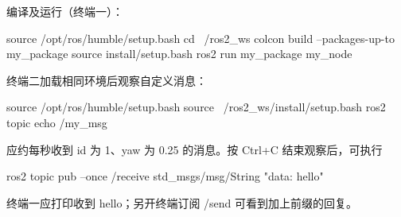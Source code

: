 \begin{example}
编译及运行（终端一）：
\begin{tbash}
source /opt/ros/humble/setup.bash
cd ~/ros2_ws
colcon build --packages-up-to my_package
source install/setup.bash
ros2 run my_package my_node
\end{tbash}
终端二加载相同环境后观察自定义消息：
\begin{tbash}
source /opt/ros/humble/setup.bash
source ~/ros2_ws/install/setup.bash
ros2 topic echo /my_msg
\end{tbash}
应约每秒收到 id 为 1、yaw 为 0.25 的消息。按 Ctrl+C 结束观察后，可执行
\begin{tbash}
ros2 topic pub --once /receive std_msgs/msg/String "{data: hello}"
\end{tbash}
终端一应打印收到 hello；另开终端订阅 /send 可看到加上前缀的回复。
\end{example}

